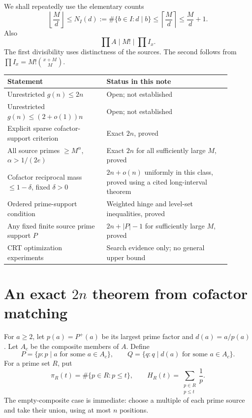 \documentclass[11pt,a4paper]{article}
\theoremstyle{remark}
\begin{document}
We shall repeatedly use the elementary counts
\[
 \left\lfloor\frac M d\right\rfloor
 \le N_I(d):=\#\{b\in I:d\mid b\}
 \le \left\lceil\frac M d\right\rceil
 \le \frac M d+1.
 \tag{1.1}
\]
Also
\[
 \prod A\mid M!\mid\prod I_x.
 \tag{1.2}
\]
The first divisibility uses distinctness of the sources. The second
follows from \(\prod I_x=M!\binom{x+M}{M}\).

\begin{center}
\small
\begin{tabular}{p{0.40\linewidth}p{0.50\linewidth}}
\toprule
Statement & Status in this note\\
\midrule
Unrestricted \(g(n)\le2n\) & Open; not established\\
Unrestricted \(g(n)\le(2+o(1))n\) & Open; not established\\
Explicit sparse cofactor-support criterion & Exact \(2n\), proved\\
All source primes \(\ge M^\alpha\), \(\alpha>1/(2e)\) & Exact \(2n\) for all sufficiently large \(M\), proved\\
Cofactor reciprocal mass \(\le1-\delta\), fixed \(\delta>0\) & \(2n+o(n)\) uniformly in this class, proved using a cited long-interval theorem\\
Ordered prime-support condition & Weighted hinge and level-set inequalities, proved\\
Any fixed finite source prime support \(P\) & \(2n+|P|-1\) for sufficiently large \(M\), proved\\
CRT optimization experiments & Search evidence only; no general upper bound\\
\bottomrule
\end{tabular}
\end{center}

\section{An exact \(2n\) theorem from cofactor matching}
\label{sec:exact}

For \(a\ge2\), let \(p(a)=P^+(a)\) be its largest prime factor and
\(d(a)=a/p(a)\). Let \(A_c\) be the composite members of \(A\). Define
\[
 P=\{p:p\mid a\text{ for some }a\in A_c\},\qquad
 Q=\{q:q\mid d(a)\text{ for some }a\in A_c\}.
 \tag{2.1}
\]
For a prime set \(R\), put
\[
 \pi_R(t)=\#\{p\in R:p\le t\},\qquad H_R(t)=\sum_{\substack{p\in R\\p\le t}}\frac1p.
 \tag{2.2}
\]
The empty-composite case is immediate: choose a multiple of each prime
source and take their union, using at most \(n\) positions.
\end{document}
